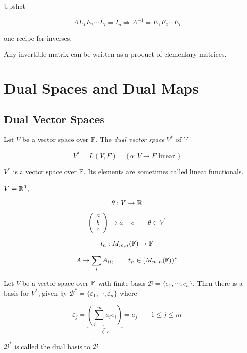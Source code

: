 \documentclass[a4paper]{article}
\begin{document}
Upshot 

\[ A E_{1} E_{2} \cdots E_{l} = I_{n} \Rightarrow A^{-1} = E_{1} E_{2} \cdots E_{l} \]

one recipe for inverses.

\begin{prop} 
	Any invertible matrix can be written as a product of elementary matrices.
\end{prop}


\section{Dual Spaces and Dual Maps}
\subsection{Dual Vector Spaces}

\begin{defi}
	Let $ V $ be a vector space over $ \mathbb{F} $. The \emph{dual vector space} $ V^{*} $ of $ V $
	
	\[ V^{*} = L(V,F) = \{ \alpha : V \to F \text{ linear } \}  \]
\end{defi}

$ V^{*} $ is a vector space over $ \mathbb{F} $. Its elements are sometimes called linear functionals. 

\begin{eg}
	$ V = \mathbb{R}^{3} $,
	
	\[ \theta: V \to \mathbb{R} \]
	
	\[ \begin{pmatrix}
	a \\
	b\\
	c
	\end{pmatrix} \to a - c \qquad \theta \in V^{*} \]
\end{eg}

\begin{eg}
	\[ t_{n}:  M_{m,n}(\mathbb{F}) \to \mathbb{F} \]
	
	\[ A \mapsto \sum_{i} A_{ii}, \qquad t_{n} \in (M_{m,n}(\mathbb{F}))^{*} \]
\end{eg}

\begin{lemma} 
	Let $ V $ be a vector space over $ \mathbb{F} $ with finite basis $ \mathcal{B} = \{ e_{1},\cdots,e_{n} \} $. Then there is a basis for $ V^{*} $, given by $ \mathcal{B}^{*} = \{  \varepsilon_{1},\cdots,\varepsilon_{n} \}  $ where 
	
	\[ \varepsilon_{j} = \underbrace{\left(   \sum_{i=1}^{m}  a_{i} e_{i}  \right) }_{\in V} = a_{j}  \qquad 1 \leq j \leq m \]
	
	$ \mathcal{B}^{*} $ is called the dual basis to $ \mathcal{B} $
\end{lemma}
\end{document}
